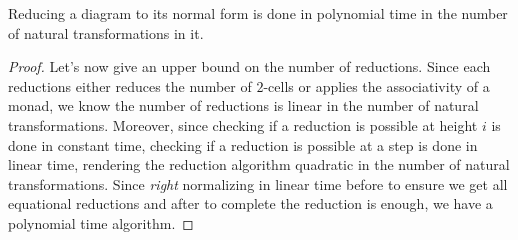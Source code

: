\begin{theorem}
	\label{thm:norm}
	Reducing a diagram to its normal form is done in polynomial time in
	the number of natural transformations in it.
\end{theorem}
\begin{proof}
	Let's now give an upper bound on the number of reductions.
	Since each reductions either reduces the number of $2$-cells or applies the
	associativity of a monad, we know the number of reductions is linear in the
	number of natural transformations.
	Moreover, since checking if a reduction is possible at height $i$ is done in
	constant time, checking if a reduction is possible at a step is done in
	linear time, rendering the reduction algorithm quadratic in the number of
	natural transformations.
	Since \emph{right} normalizing in linear time before to ensure we get all
	equational reductions and after to complete the reduction is enough,
	we have a polynomial time algorithm.
\end{proof}

